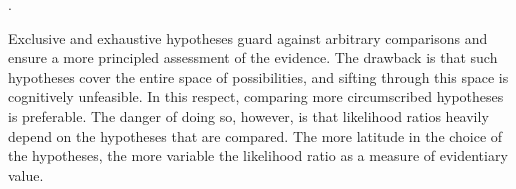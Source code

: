 \documentclass{article}
\begin{document}
\citep{evett2000MoreHierarchyPropositions}. 




Exclusive and exhaustive hypotheses guard against arbitrary comparisons and ensure a more principled  assessment of the evidence. The drawback is that such hypotheses cover the entire space of possibilities, and sifting through this space is cognitively unfeasible. In this respect, comparing more circumscribed hypotheses is preferable. The danger of doing so, however, is that likelihood ratios heavily depend on the hypotheses that are compared. The more latitude in the choice of the hypotheses,
the more variable the likelihood ratio as a measure of evidentiary value. 


%




\end{document}
